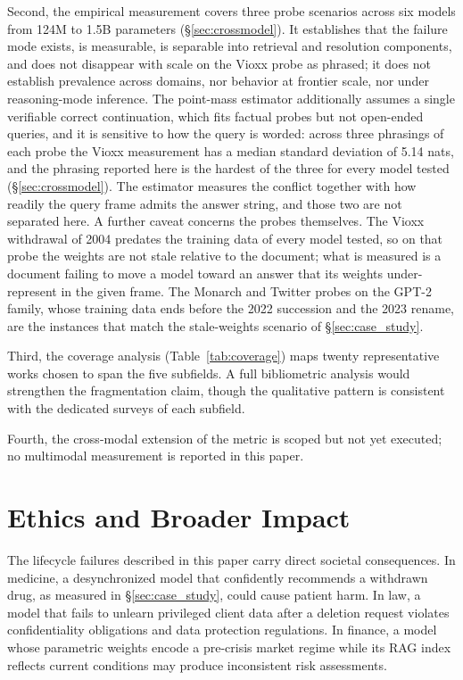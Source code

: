 \documentclass[manuscript, screen, review]{jair}
\begin{document}
Second, the empirical measurement covers three probe scenarios across six models from 124M to 1.5B parameters (\S\ref{sec:crossmodel}). It establishes that the failure mode exists, is measurable, is separable into retrieval and resolution components, and does not disappear with scale on the Vioxx probe as phrased; it does not establish prevalence across domains, nor behavior at frontier scale, nor under reasoning-mode inference. The point-mass estimator additionally assumes a single verifiable correct continuation, which fits factual probes but not open-ended queries, and it is sensitive to how the query is worded: across three phrasings of each probe the Vioxx measurement has a median standard deviation of 5.14 nats, and the phrasing reported here is the hardest of the three for every model tested (\S\ref{sec:crossmodel}). The estimator measures the conflict together with how readily the query frame admits the answer string, and those two are not separated here. A further caveat concerns the probes themselves. The Vioxx withdrawal of 2004 predates the training data of every model tested, so on that probe the weights are not stale relative to the document; what is measured is a document failing to move a model toward an answer that its weights under-represent in the given frame. The Monarch and Twitter probes on the GPT-2 family, whose training data ends before the 2022 succession and the 2023 rename, are the instances that match the stale-weights scenario of \S\ref{sec:case_study}.

Third, the coverage analysis (Table~\ref{tab:coverage}) maps twenty representative works chosen to span the five subfields. A full bibliometric analysis would strengthen the fragmentation claim, though the qualitative pattern is consistent with the dedicated surveys of each subfield.

Fourth, the cross-modal extension of the metric is scoped but not yet executed; no multimodal measurement is reported in this paper.

\section{Ethics and Broader Impact}
\label{sec:ethics}

The lifecycle failures described in this paper carry direct societal consequences. In medicine, a desynchronized model that confidently recommends a withdrawn drug, as measured in \S\ref{sec:case_study}, could cause patient harm. In law, a model that fails to unlearn privileged client data after a deletion request violates confidentiality obligations and data protection regulations. In finance, a model whose parametric weights encode a pre-crisis market regime while its RAG index reflects current conditions may produce inconsistent risk assessments.
\end{document}
